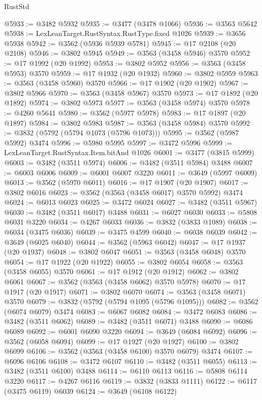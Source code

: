 \begin{lexlean}{RustStd}
\begin{coremodule}
{\begin{coremodule}
{{{{{{{{{{{{{{{{{{{{{{{{{{{{{{{{{{{{{{{{{{{{{@5933 := @3482 @5932
@5935 := @3477 (@3478 @1066)
@5936 := @3563 @5642
@5938 := LexLeanTarget.RustSyntax.RustType.fixed @1026
@5939 := @3656 @5938
@5942 := @3562 (@5936 @5939 @5781)
@5945 := @17 @2108 (@20 @2108)
@5946 := @3802 @5945
@5949 := @3563 (@3458 @5946) @3570
@5952 := @17 @1992 (@20 @1992)
@5953 := @3802 @5952
@5956 := @3563 (@3458 @5953) @3570
@5959 := @17 @1932 (@20 @1932)
@5960 := @3802 @5959
@5963 := @3563 (@3458 @5960) @3570
@5966 := @17 @1902 (@20 @1902)
@5967 := @3802 @5966
@5970 := @3563 (@3458 @5967) @3570
@5973 := @17 @1892 (@20 @1892)
@5974 := @3802 @5973
@5977 := @3563 (@3458 @5974) @3570
@5978 := @4260 @5641
@5980 := @3562 (@5977 @5978)
@5983 := @17 @1897 (@20 @1897)
@5984 := @3802 @5983
@5987 := @3563 (@3458 @5984) @3570
@5992 := @3832 (@5792 (@5794 @1073 (@5796 @1073)))
@5995 := @3562 (@5987 @5992) @3474
@5996 := @5980 @5995
@5997 := @3472 @5996
@5999 := LexLeanTarget.RustSyntax.Item.bitAnd @1026
@6001 := @3477 (@3815 @5999)
@6003 := @3482 (@3511 @5974)
@6006 := @3482 (@3511 @5984) @3488
@6007 := @6003 @6006
@6009 := @6001 @6007 @3220
@6011 := @3649 (@5997 @6009)
@6013 := @3562 (@5970 @6011)
@6016 := @17 @1907 (@20 @1907)
@6017 := @3802 @6016
@6023 := @3562 (@3563 (@3458 @6017) @3570 @5992) @3474
@6024 := @6013 @6023
@6025 := @3472 @6024
@6027 := @3482 (@3511 @5967)
@6030 := @3482 (@3511 @6017) @3488
@6031 := @6027 @6030
@6033 := @5808 @6031 @3220
@6034 := @4267 @6033
@6036 := @3832 (@3833 @1089)
@6038 := @6034 (@3475 @6036)
@6039 := @3475 @4599
@6040 := @6038 @6039
@6042 := @3649 (@6025 @6040)
@6044 := @3562 (@5963 @6042)
@6047 := @17 @1937 (@20 @1937)
@6048 := @3802 @6047
@6051 := @3563 (@3458 @6048) @3570
@6054 := @17 @1922 (@20 @1922)
@6055 := @3802 @6054
@6058 := @3563 (@3458 @6055) @3570
@6061 := @17 @1912 (@20 @1912)
@6062 := @3802 @6061
@6067 := @3562 (@3563 (@3458 @6062) @3570 @5978)
@6070 := @17 @1917 (@20 @1917)
@6071 := @3802 @6070
@6074 := @3563 (@3458 @6071) @3570
@6079 := @3832 (@5792 (@5794 @1095 (@5796 @1095)))
@6082 := @3562 (@6074 @6079) @3474
@6083 := @6067 @6082
@6084 := @3472 @6083
@6086 := @3482 (@3511 @6062)
@6089 := @3482 (@3511 @6071) @3488
@6090 := @6086 @6089
@6092 := @6001 @6090 @3220
@6094 := @3649 (@6084 @6092)
@6096 := @3562 (@6058 @6094)
@6099 := @17 @1927 (@20 @1927)
@6100 := @3802 @6099
@6106 := @3562 (@3563 (@3458 @6100) @3570 @6079) @3474
@6107 := @6096 @6106
@6108 := @3472 @6107
@6110 := @3482 (@3511 @6055)
@6113 := @3482 (@3511 @6100) @3488
@6114 := @6110 @6113
@6116 := @5808 @6114 @3220
@6117 := @4267 @6116
@6119 := @3832 (@3833 @1111)
@6122 := @6117 (@3475 @6119) @6039
@6124 := @3649 (@6108 @6122)
}}}}}}}}}}}}}}}}}}}}}}}}}}}}}}}}}}}}}}}}}}}}}
\end{coremodule}}
\end{coremodule}
\end{lexlean}
